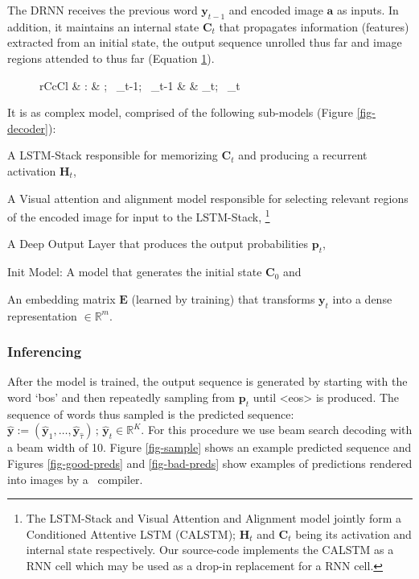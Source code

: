 \documentclass{article}
\begin{document}
The DRNN receives the previous word $\boldsymbol{y}_{t-1}$ and encoded image $\boldsymbol{a}$ as inputs. In addition, it maintains an internal state $\boldsymbol{C}_t$ that propagates information (features) extracted from an initial state, the output sequence unrolled thus far and image regions attended to thus far (Equation \ref{eqn-rnn}).
\begin{figure}
	\begin{IEEEeqnarray}{rCcCl}
		 & : & \lbrace {}; \,  _{t-1}; \, _{t-1} \rbrace & \rightarrow & \lbrace  {}_t; \, _{t} \rbrace \label{eqn-rnn}
	\end{IEEEeqnarray}
\end{figure}
It is as complex model, comprised of the following sub-models (Figure \ref{fig-decoder}):
\begin{enumerate*}[label=\arabic*)]
	\item A {LSTM-Stack} \cite{Hochreiter:1997:LSM:1246443.1246450} responsible for memorizing $\boldsymbol{C}_t$ and producing a recurrent activation $\boldsymbol{H}_{t}$,
	\item A Visual {attention} and alignment model responsible for selecting relevant regions of the encoded image for input to the LSTM-Stack, \footnote{The LSTM-Stack and Visual Attention and Alignment model jointly form a Conditioned Attentive LSTM (CALSTM); $\boldsymbol{H}_t$ and $\boldsymbol{C}_t$ being its activation and internal state respectively. Our source-code implements the CALSTM as a RNN cell which may be used as a drop-in replacement for a RNN cell.}
	\item A {Deep Output} Layer \cite{Pascanu2013HowTC} that produces the output probabilities $\boldsymbol{p}_t$,
	\item {Init Model}: A model that generates the initial state $\boldsymbol{C}_{0}$ and
	\item An {embedding} matrix $\boldsymbol{E}$ (learned by training) that transforms $\boldsymbol{y}_t$ into a dense representation $\in \mathbb{R}^m$.
\end{enumerate*}


\subsubsection{Inferencing}
After the model is trained, the output sequence is generated by starting with the word `bos' and then repeatedly sampling from $\boldsymbol{p}_t$ until <eos> is produced. The sequence of words thus sampled is the predicted sequence: $\boldsymbol{\hat{y}} := ( \boldsymbol{\hat{y}}_1, \ldots, \boldsymbol{\hat{y}}_{\hat{\tau}} ) \, ; \, \boldsymbol{\hat{y}}_{t} \in \mathbb{R}^K$.  For this procedure we use beam search decoding \cite{Graves2008SupervisedSL} with a beam width of 10. Figure \ref{fig-sample} shows an example predicted sequence and Figures \ref{fig-good-preds} and \ref{fig-bad-preds} show examples of predictions rendered into images by a \LaTeXe ~compiler.
\end{document}
